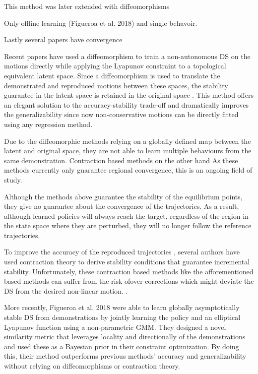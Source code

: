 This method was later extended with diffeomorphisms 

Only offline learning (Figueroa et al. 2018) and single behavoir.



Lastly several papers have convergence



Recent papers have used a diffeomorphism to train a non-autonomous DS on the motions directly while applying the Lyapunov constraint to a topological equivalent latent space. Since a diffeomorphism is used to translate the demonstrated and reproduced motions between these spaces, the stability guarantee in the latent space is retained in the original space \cite{leeIntroductionTopologicalManifolds2011,leeIntroductionSmoothManifolds2012,leeIntroductionRiemannianManifolds2018}. This method offers an elegant solution to the accuracy-stability trade-off and dramatically improves the generalizability since now non-conservative motions can be directly fitted using any regression method. 

Due to the diffeomorphic methods relying on a globally defined map between the latent and original space, they are not able to learn multiple behaviours from the same demonstration. Contraction based methods on the other hand As these methods currently only guarantee regional convergence, this is an ongoing field of study.

Although the methods above guarantee the stability of the equilibrium points, they give no guarantee about the convergence of the trajectories. As a result, although learned policies will always reach the target, regardless of the region in the state space where they are perturbed, they will no longer follow the reference trajectories. 

To improve the accuracy of the reproduced trajectories \cite{blocherLearningStableDynamical2017}, several authors have used contraction theory to derive stability conditions that guarantee incremental stability. Unfortunately, these contraction based methods like the afforementioned based methods can suffer from the risk ofover-corrections which might deviate the DS from the desired non-linear motion. \cite{figueroafernandezPhysicallyconsistentBayesianNonparametric2018}. 

More recently, Figueroa et al. 2018 \cite{figueroafernandezPhysicallyconsistentBayesianNonparametric2018} were able to learn globally asymptotically stable DS from demonstrations by jointly learning the policy and an elliptical Lyapunov function using a non-parametric GMM. They designed a novel similarity metric that leverages locality and directionally of the demonstrations and used these as a Bayesian prior in their constraint optimization. By doing this, their method outperforms previous methods' accuracy and generalizability without relying on diffeomorphisms or contraction theory.

